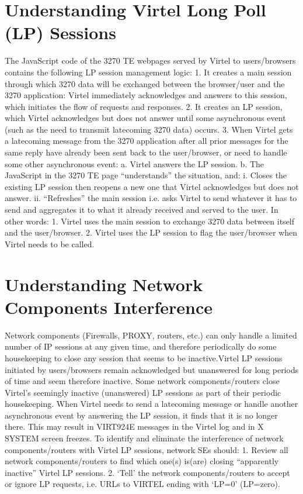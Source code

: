\documentclass[letterpaper,10pt,english]{sphinxmanual}
\begin{document}
\section{Understanding Virtel Long Poll (LP) Sessions}
\label{\detokenize{connectivity_guide:understanding-virtel-long-poll-lp-sessions}}
\sphinxAtStartPar
The JavaScript code of the 3270 TE webpages served by Virtel to users/browsers contains the following LP session management logic:
1.      It creates a main session through which 3270 data will be exchanged between the browser/user and the 3270 application: Virtel immediately acknowledges and answers to this session, which initiates the flow of requests and responses.
2.      It creates an LP session, which Virtel acknowledges but does not answer until some asynchronous event (such as the need to transmit late\sphinxhyphen{}coming 3270 data) occurs.
3.      When Virtel gets a late\sphinxhyphen{}coming message from the 3270 application after all prior messages for the same reply have already been sent back to the user/browser, or need to handle some other asynchronous event:
a.      Virtel answers the LP session.
b.      The JavaScript in the 3270 TE page “understands” the situation, and:
i.      Closes the existing LP session then reopens a new one that Virtel acknowledges but does not answer.
ii.     “Refreshes” the main session i.e. asks Virtel to send whatever it has to send and aggregates it to what it already received and served to the user.
In other words:
1.      Virtel uses the main session to exchange 3270 data between itself and the user/browser.
2.      Virtel uses the LP session to flag the user/browser when Virtel needs to be called.


\section{Understanding Network Components Interference}
\label{\detokenize{connectivity_guide:understanding-network-components-interference}}
\sphinxAtStartPar
Network components (Firewalls, PROXY, routers, etc.) can only handle a limited number of IP sessions at any given time, and therefore periodically do some housekeeping to close any session that seems to be inactive.Virtel LP sessions initiated by users/browsers remain acknowledged but unanswered for long periods of time and seem therefore inactive. Some network components/routers close Virtel’s seemingly inactive (unanswered) LP sessions as part of their periodic housekeeping. When Virtel needs to send a late\sphinxhyphen{}coming message or handle another asynchronous event by answering the LP session, it finds that it is no longer there. This may result in VIRT924E messages in the Virtel log and in X SYSTEM screen freezes. To identify and eliminate the interference of network components/routers with Virtel LP sessions, network SEs should:
1.      Review all network components/routers to find which one(s) is(are) closing “apparently inactive” Virtel LP sessions.
2.      ‘Tell’ the network components/routers to accept or ignore LP requests, i.e. URLs to VIRTEL ending with ‘LP=0’ (LP=zero).
\end{document}
